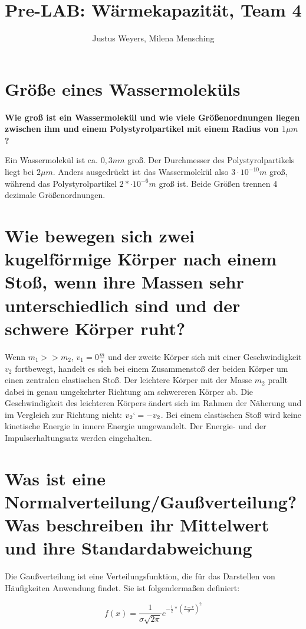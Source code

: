\documentclass[a4paper, 12pt]{article}
\title{Pre-LAB: Wärmekapazität, Team 4}
\author{Justus Weyers, Milena Mensching}
\begin{document}
\maketitle
\section{Größe eines Wassermoleküls}
\textbf{Wie groß ist ein Wassermolekül und wie viele Größenordnungen liegen zwischen ihm und einem Polystyrolpartikel mit einem Radius von $1\mu m$?}

Ein Wassermolekül ist ca. $0,3 nm$ groß. Der Durchmesser des Polystyrolpartikels liegt bei $2\mu m$. Anders ausgedrückt ist das Wassermolekül also $3 \cdot 10^{-10}m$ groß, während das Polystyrolpartikel $2* \cdot 10^{-6}m$  groß ist. Beide Größen trennen 4 dezimale Größenordnungen.

\section{Wie bewegen sich zwei kugelförmige Körper nach einem Stoß, wenn ihre Massen sehr
unterschiedlich sind und der schwere Körper ruht?}

Wenn $m_1>>m_2$, $v_1= 0 \frac{m}{s} $ und der zweite Körper sich mit einer Geschwindigkeit $v_2$ fortbewegt, handelt es sich bei einem Zusammenstoß der beiden Körper um einen zentralen elastischen Stoß. Der leichtere Körper mit der Masse $m_2$ prallt dabei in genau umgekehrter Richtung am schwereren Körper ab. Die Geschwindigkeit des leichteren Körpers ändert sich im Rahmen der Näherung und im Vergleich zur Richtung nicht: $v_2`= -v_2$. Bei einem elastischen Stoß wird keine kinetische Energie in innere Energie umgewandelt. Der Energie- und der Impulserhaltungsatz werden eingehalten.  

\section{Was ist eine Normalverteilung/Gaußverteilung? Was beschreiben ihr Mittelwert und ihre
Standardabweichung}

Die Gaußverteilung ist eine Verteilungsfunktion, die für das Darstellen von Häufigkeiten Anwendung findet. Sie ist folgendermaßen definiert:

\begin{equation}\label{Normalverteilung}
f(x) = \frac{1}{\sigma\sqrt{2\pi}}e^{-\frac{1}{2}*(\frac{x-\bar{x}}{\sigma})^2}
\end{equation}
\end{document}
